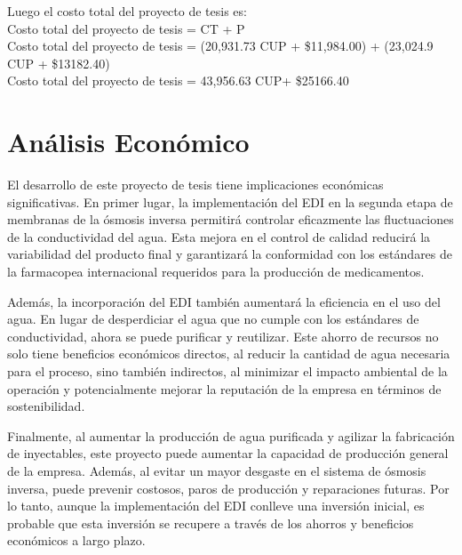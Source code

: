 Luego el costo total del proyecto de tesis es:\\
Costo total del proyecto de tesis = CT + P                                                   \\
Costo total del proyecto de tesis = (20,931.73 CUP + \$11,984.00) + (23,024.9 CUP + \$13182.40) \\
Costo total del proyecto de tesis = 43,956.63 CUP+ \$25166.40

\section{Análisis Económico}
El desarrollo de este proyecto de tesis tiene implicaciones económicas significativas. En primer lugar, la implementación del EDI en la segunda etapa de membranas de la ósmosis inversa permitirá controlar eficazmente las fluctuaciones de la conductividad del agua. Esta mejora en el control de calidad reducirá la variabilidad del producto final y garantizará la conformidad con los estándares de la farmacopea internacional requeridos para la producción de medicamentos.

Además, la incorporación del EDI también aumentará la eficiencia en el uso del agua. En lugar de desperdiciar el agua que no cumple con los estándares de conductividad, ahora se puede purificar y reutilizar. Este ahorro de recursos no solo tiene beneficios económicos directos, al reducir la cantidad de agua necesaria para el proceso, sino también indirectos, al minimizar el impacto ambiental de la operación y potencialmente mejorar la reputación de la empresa en términos de sostenibilidad.

Finalmente, al aumentar la producción de agua purificada y agilizar la fabricación de inyectables, este proyecto puede aumentar la capacidad de producción general de la empresa. Además, al evitar un mayor desgaste en el sistema de ósmosis inversa, puede prevenir costosos, paros de producción y reparaciones futuras. Por lo tanto, aunque la implementación del EDI conlleve una inversión inicial, es probable que esta inversión se recupere a través de los ahorros y beneficios económicos a largo plazo.








